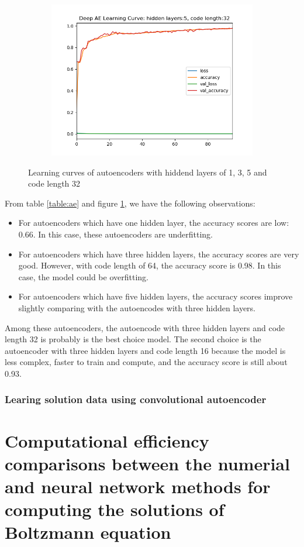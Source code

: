 \documentclass{article}
\begin{document}
\begin{figure}[h]
\begin{subfigure}{.5\textwidth}
\includegraphics[width=.75\linewidth]{LearingCurve-HL5-CL32.png}
\end{subfigure}
\caption{Learning curves of autoencoders with hiddend layers of 1, 3, 5 and code length 32 }
\label{fig:lc}
\end{figure}
\noindent From table \ref{table:ae} and figure \ref{fig:lc}, we have the following observations:
\begin{itemize}
	\item For autoencoders which have one hidden layer, the accuracy scores are low: 0.66. In this case, these autoencoders are underfitting.
	\item For autoencoders which have three hidden layers, the accuracy scores are very good. However, with code length of 64, the accuracy score is 0.98. In this case, the model could be overfitting.
	\item For autoencoders which have five hidden layers, the accuracy scores improve slightly comparing with the autoencodes with three hidden layers. 
\end{itemize}
Among these autoencoders, the autoencode with three hidden layers and code length 32 is probably is the best choice model. The second choice is the autoencoder with three hidden layers and code length 16 because the model is less complex, faster to train and compute, and the accuracy score is still about 0.93.

\subsubsection{Learing solution data using convolutional autoencoder}

\section{Computational efficiency comparisons between the numerial and neural network methods for computing the solutions of Boltzmann equation } \label{Comparisons}
\end{document}
